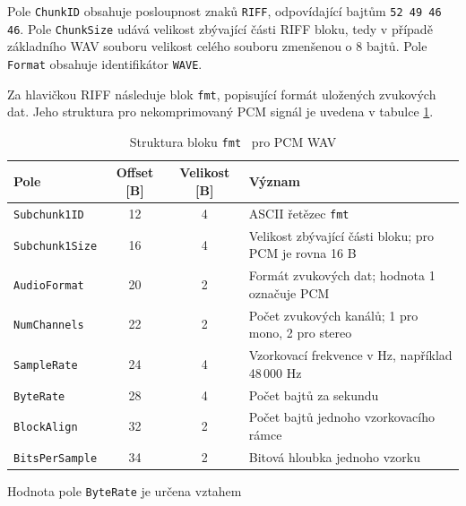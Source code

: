 \documentclass[12pt, a4paper]{article}
\begin{document}
Pole \texttt{ChunkID} obsahuje posloupnost znaků \texttt{RIFF}, odpovídající bajtům \texttt{52 49 46 46}. Pole \texttt{ChunkSize}
udává velikost zbývající části RIFF bloku, tedy v případě základního
WAV souboru velikost celého souboru zmenšenou o 8 bajtů. Pole
\texttt{Format} obsahuje identifikátor \texttt{WAVE}.

Za hlavičkou RIFF následuje blok \texttt{fmt}, popisující formát uložených zvukových dat. Jeho struktura pro nekomprimovaný PCM signál je uvedena v tabulce \ref{tab:wav_fmt}.

\begin{table}[ht]
    \centering
    \caption{Struktura bloku \texttt{fmt } pro PCM WAV}
    \label{tab:wav_fmt}
    \begin{tabular}{lccp{7cm}}
        \toprule
        \textbf{Pole} & \textbf{Offset [B]} & \textbf{Velikost [B]} & \textbf{Význam} \\
        \midrule
        \texttt{Subchunk1ID}
        & 12 & 4
        & ASCII řetězec \texttt{fmt } \\

        \texttt{Subchunk1Size}
        & 16 & 4
        & Velikost zbývající části bloku; pro PCM je rovna 16 B \\

        \texttt{AudioFormat}
        & 20 & 2
        & Formát zvukových dat; hodnota 1 označuje PCM \\

        \texttt{NumChannels}
        & 22 & 2
        & Počet zvukových kanálů; 1 pro mono, 2 pro stereo \\

        \texttt{SampleRate}
        & 24 & 4
        & Vzorkovací frekvence v Hz, například 48\,000 Hz \\

        \texttt{ByteRate}
        & 28 & 4
        & Počet bajtů za sekundu \\

        \texttt{BlockAlign}
        & 32 & 2
        & Počet bajtů jednoho vzorkovacího rámce \\

        \texttt{BitsPerSample}
        & 34 & 2
        & Bitová hloubka jednoho vzorku \\
        \bottomrule
    \end{tabular}
\end{table}

Hodnota pole \texttt{ByteRate} je určena vztahem
\end{document}
